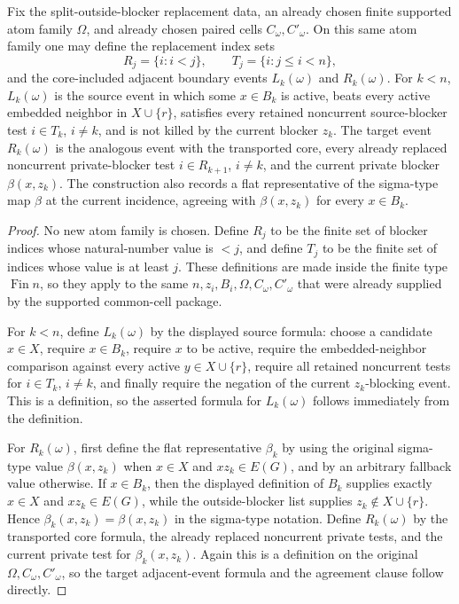 \begin{helper}
Fix the split-outside-blocker replacement data, an already chosen finite
supported atom family \(\Omega\), and already chosen paired cells
\(C_\omega,C'_\omega\).  On this same atom family one may define the
replacement index sets
\[
  R_j=\{i:i<j\},\qquad T_j=\{i:j\le i<n\},
\]
and the core-included adjacent boundary events \(L_k(\omega)\) and
\(R_k(\omega)\).  For \(k<n\), \(L_k(\omega)\) is the source event in which
some \(x\in B_k\) is active, beats every active embedded neighbor in
\(X\cup\{r\}\), satisfies every retained noncurrent source-blocker test
\(i\in T_k\), \(i\ne k\), and is not killed by the current blocker \(z_k\).
The target event \(R_k(\omega)\) is the analogous event with the transported
core, every already replaced noncurrent private-blocker test
\(i\in R_{k+1}\), \(i\ne k\), and the current private blocker
\(\beta(x,z_k)\).  The construction also records a flat representative of
the sigma-type map \(\beta\) at the current incidence, agreeing with
\(\beta(x,z_k)\) for every \(x\in B_k\).
\end{helper}
\begin{proof}
No new atom family is chosen.  Define \(R_j\) to be the finite set of blocker
indices whose natural-number value is \(<j\), and define \(T_j\) to be the
finite set of indices whose value is at least \(j\).  These definitions are
made inside the finite type \(\operatorname{Fin} n\), so they apply to the
same \(n,z_i,B_i,\Omega,C_\omega,C'_\omega\) that were already supplied by
the supported common-cell package.

For \(k<n\), define \(L_k(\omega)\) by the displayed source formula: choose a
candidate \(x\in X\), require \(x\in B_k\), require \(x\) to be active, require
the embedded-neighbor comparison against every active \(y\in X\cup\{r\}\),
require all retained noncurrent tests for \(i\in T_k\), \(i\ne k\), and
finally require the negation of the current \(z_k\)-blocking event.  This is
a definition, so the asserted formula for \(L_k(\omega)\) follows
immediately from the definition.

For \(R_k(\omega)\), first define the flat representative \(\beta_k\) by
using the original sigma-type value \(\beta(x,z_k)\) when \(x\in X\) and
\(x z_k\in E(G)\), and by an arbitrary fallback value otherwise.  If
\(x\in B_k\), then the displayed definition of \(B_k\) supplies exactly
\(x\in X\) and \(x z_k\in E(G)\), while the outside-blocker list supplies
\(z_k\notin X\cup\{r\}\).  Hence \(\beta_k(x,z_k)=\beta(x,z_k)\) in the
sigma-type notation.  Define \(R_k(\omega)\) by the transported core formula,
the already replaced noncurrent private tests, and the current private test
for \(\beta_k(x,z_k)\).  Again this is a definition on the original
\(\Omega,C_\omega,C'_\omega\), so the target adjacent-event formula and the
agreement clause follow directly.
\end{proof}
